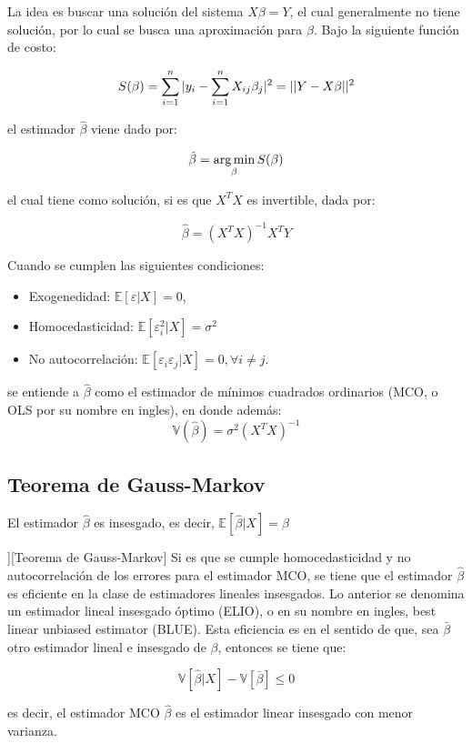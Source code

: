 \begin{definition}

La idea es buscar una solución del sistema $X\beta=Y$, el cual generalmente no tiene solución, por lo cual se busca una aproximación para $\beta$. Bajo la siguiente función de costo:

\[S(\beta)=\sum\limits_{i=1}^{n}|y_i-\sum\limits\limits_{i=1}^{n}X_{ij}\beta_{j}|^2=||Y-X\beta||^2\]

el estimador $\hat{\beta}$ viene dado por:

\[\hat{\beta}=\operatorname*{arg\,min}_\beta S(\beta)\]

el cual tiene como solución, si es que $X^{T}X$ es invertible, dada por:

$$
\hat{\beta}= (X^{T}X)^{-1}X^{T}Y
$$

Cuando se cumplen las siguientes condiciones:
\begin{itemize}
    \item Exogenedidad: $\mathbb{E}[\varepsilon|X]=0$, 
    \item Homocedasticidad: $\mathbb{E}[\varepsilon^2_i|X]=\sigma^2 $
    \item No autocorrelación: $\mathbb{E}[\varepsilon_i\varepsilon_j|X]=0,\forall i\neq j$.
\end{itemize}

se entiende a $\hat{\beta}$ como el estimador de mínimos cuadrados ordinarios (MCO, o OLS por su nombre en ingles), en donde además:
$$
\mathbb{V}(\hat{\beta})= \sigma^{2}(X^{T}X)^{-1}
$$
\end{definition}

\subsection{Teorema de Gauss-Markov}

\begin{prop}
El estimador $\hat{\beta}$ es insesgado, es decir, $\mathbb{E}[\hat{\beta}|X]=\beta$
\end{prop}

\begin{theorem}][Teorema de Gauss-Markov]
Si es que se cumple homocedasticidad y no autocorrelación de los errores para el estimador MCO, se tiene que el estimador $\hat{\beta}$ es eficiente en la clase de estimadores lineales insesgados. Lo anterior se denomina un estimador lineal insesgado óptimo (ELIO), o en su nombre en ingles, best linear unbiased estimator (BLUE). Esta eficiencia es en el sentido de que, sea $\bar{\beta}$ otro estimador lineal e insesgado de $\beta$, entonces se tiene que:

\[\mathbb{V}[\hat{\beta}|X]-\mathbb{V}[\bar{\beta}]\leq 0\]
\end{theorem}
es decir, el estimador MCO $\hat{\beta}$ es el estimador linear insesgado con menor varianza. 




